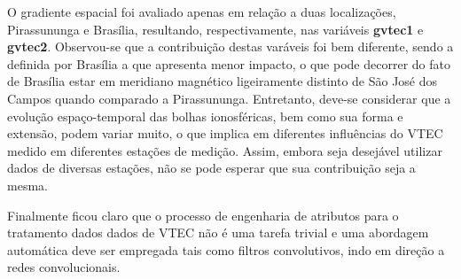 O gradiente espacial foi avaliado apenas em relação a duas localizações, Pirassununga e Brasília, resultando, respectivamente, nas variáveis  {\bf gvtec1} e {\bf gvtec2}. Observou-se que a contribuição destas varáveis foi bem diferente, sendo a definida por Brasília a que apresenta menor impacto, o que pode decorrer do fato de Brasília estar em meridiano magnético ligeiramente distinto de São José dos Campos quando comparado a Pirassununga. Entretanto, deve-se considerar que a evolução espaço-temporal das bolhas ionosféricas, bem como sua forma e extensão, podem variar muito, o que implica em diferentes influências do VTEC medido em diferentes estações de medição. Assim, embora seja desejável utilizar dados de diversas estações, não se pode esperar que sua contribuição seja a mesma.

Finalmente ficou claro que o processo de engenharia de atributos para o tratamento dados dados de VTEC não é uma tarefa trivial e uma abordagem automática deve ser empregada tais como filtros convolutivos, indo em direção a redes convolucionais.


